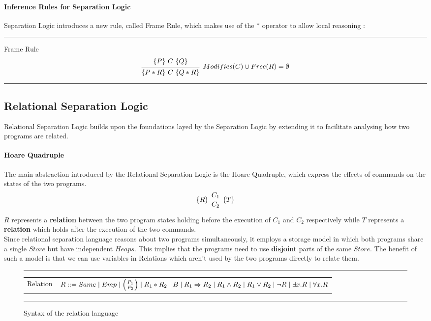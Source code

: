 \documentclass[12pt,a4paper]{article}
\begin{document}
\paragraph{Inference Rules for Separation Logic} 
Separation Logic introduces a new rule, called Frame Rule, which makes use of the \(*\) operator to allow local reasoning :
\\
\noindent\rule{\linewidth}{0.4pt}
Frame Rule
\medskip
\[
\begin{prooftree}
\Hypo{\{P\}\ C\ \{Q\}}
\Infer 1 [\(Modifies(C) \cup Free(R) = \emptyset \)]{\{P * R \}\ C\ \{Q * R\}}
\end{prooftree}		
\]
\noindent\rule{\linewidth}{0.4pt}
\subsection{Relational Separation Logic}
Relational Separation Logic builds upon the foundations layed by the Separation Logic by extending it to facilitate analysing how two programs are related. 
\paragraph{Hoare Quadruple}
The main abstraction introduced by the Relational Separation Logic is the Hoare Quadruple, which express the effects of commands on the states of the two programs. 
\[\{R\}\ {C_1 \atop C_2}\   \{T\}\]

\(R\) represents a \textbf{relation} between the two program states holding before the execution of \(C_1\) and \(C_2\) respectively while \(T\) represents a \textbf{relation} which holds after the execution of the two commands. 
\\

Since relational separation language reasons about two programs simultaneously, it employs a storage model in which both programs share a single \(Store\) but have independent \(Heaps\). This implies that the programs need to use \textbf{disjoint} parts of the same \(Store\). The benefit of such a model is that we can use variables in Relations which aren't used by the two programs directly to relate them.
\begin{figure}[h]
	\noindent\rule{\linewidth}{0.4pt}
	\medskip
	\begin{tabularx}{\linewidth}{l  X}
		Relation& \(R ::= Same \mid Emp \mid \left( P_1 \atop P_2 \right) \mid R_1 * R_2 \mid B \mid R_1 \Rightarrow R_2 \mid R_1 \land R_2 \mid R_1 \lor R_2 \mid \neg R \mid \exists x. R \mid \forall x. R \) \\
	\end{tabularx}
	\caption{Syntax of the relation language}
	\label{fig:RelationSyntax}
	\noindent\rule{\linewidth}{0.4pt}
\end{figure}
\end{document}
